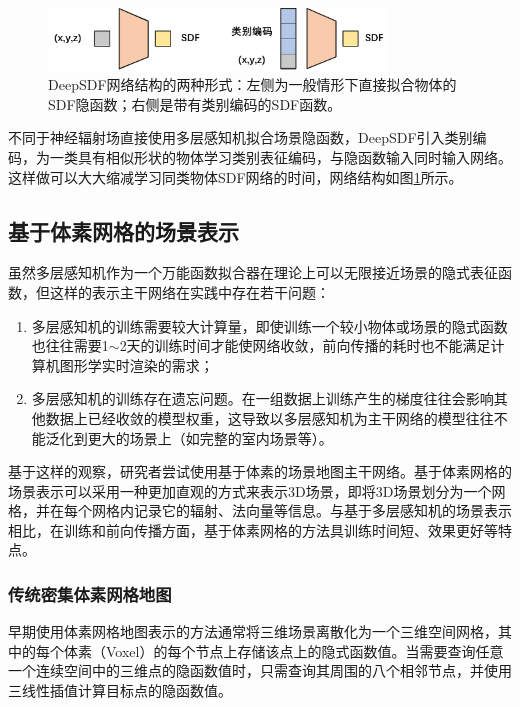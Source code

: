 \begin{figure}[ht]
    \centering
    \includegraphics[width=0.8\textwidth]{undergraduate-thesis/images/related-work/deepSDF.pdf}
    \caption{DeepSDF网络结构的两种形式：左侧为一般情形下直接拟合物体的SDF隐函数；右侧是带有类别编码的SDF函数。}
    \label{fig:related-work DeepSDF}
\end{figure}

不同于神经辐射场直接使用多层感知机拟合场景隐函数，DeepSDF引入类别编码，为一类具有相似形状的物体学习类别表征编码，与隐函数输入同时输入网络。这样做可以大大缩减学习同类物体SDF网络的时间，网络结构如图\ref{fig:related-work DeepSDF}所示。



\subsection{基于体素网格的场景表示}
\label{sec: related-work grid-based implicit representations}
虽然多层感知机作为一个万能函数拟合器在理论上可以无限接近场景的隐式表征函数，但这样的表示主干网络在实践中存在若干问题：
\begin{enumerate}
    \item 多层感知机的训练需要较大计算量，即使训练一个较小物体或场景的隐式函数也往往需要1$\sim$2天的训练时间才能使网络收敛，前向传播的耗时也不能满足计算机图形学实时渲染的需求；
    \item 多层感知机的训练存在遗忘问题。在一组数据上训练产生的梯度往往会影响其他数据上已经收敛的模型权重，这导致以多层感知机为主干网络的模型往往不能泛化到更大的场景上（如完整的室内场景等）。
\end{enumerate}

基于这样的观察，研究者尝试使用基于体素的场景地图主干网络。基于体素网格的场景表示可以采用一种更加直观的方式来表示3D场景，即将3D场景划分为一个网格，并在每个网格内记录它的辐射、法向量等信息。与基于多层感知机的场景表示相比，在训练和前向传播方面，基于体素网格的方法具训练时间短、效果更好等特点。

\subsubsection{传统密集体素网格地图}
早期使用体素网格地图表示的方法\cite{fridovich-keil_plenoxels_2022, kondo_vaxnerf_2021, yu_monosdf_2022}通常将三维场景离散化为一个三维空间网格，其中的每个体素（Voxel）的每个节点上存储该点上的隐式函数值。当需要查询任意一个连续空间中的三维点的隐函数值时，只需查询其周围的八个相邻节点，并使用三线性插值计算目标点的隐函数值。

